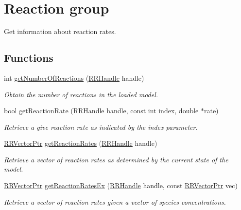 \hypertarget{group__reaction}{\section{Reaction group}
\label{group__reaction}
}


Get information about reaction rates.  


\subsection*{Functions}
\begin{DoxyCompactItemize}
\item 
int \hyperlink{group__reaction_ga45a8bf0e5d7c9012222f0ad4c36e6731}{get\-Number\-Of\-Reactions} (\hyperlink{rrc__types_8h_a1d68f0592372208fa5a5f2799ea4b3ae}{R\-R\-Handle} handle)
\begin{DoxyCompactList}\small\item\em Obtain the number of reactions in the loaded model. \end{DoxyCompactList}\item 
bool \hyperlink{group__reaction_ga9e5d91c68214fd9642d3ffb9338cae19}{get\-Reaction\-Rate} (\hyperlink{rrc__types_8h_a1d68f0592372208fa5a5f2799ea4b3ae}{R\-R\-Handle} handle, const int index, double $\ast$rate)
\begin{DoxyCompactList}\small\item\em Retrieve a give reaction rate as indicated by the index parameter. \end{DoxyCompactList}\item 
\hyperlink{rrc__types_8h_a3be72d6006034fd349f753d2bf441bf7}{R\-R\-Vector\-Ptr} \hyperlink{group__reaction_gaa4b8c528a76898bbb78cfa41479dd085}{get\-Reaction\-Rates} (\hyperlink{rrc__types_8h_a1d68f0592372208fa5a5f2799ea4b3ae}{R\-R\-Handle} handle)
\begin{DoxyCompactList}\small\item\em Retrieve a vector of reaction rates as determined by the current state of the model. \end{DoxyCompactList}\item 
\hyperlink{rrc__types_8h_a3be72d6006034fd349f753d2bf441bf7}{R\-R\-Vector\-Ptr} \hyperlink{group__reaction_ga1dd7908ba77e177592587da9c21ed4f6}{get\-Reaction\-Rates\-Ex} (\hyperlink{rrc__types_8h_a1d68f0592372208fa5a5f2799ea4b3ae}{R\-R\-Handle} handle, const \hyperlink{rrc__types_8h_a3be72d6006034fd349f753d2bf441bf7}{R\-R\-Vector\-Ptr} vec)
\begin{DoxyCompactList}\small\item\em Retrieve a vector of reaction rates given a vector of species concentrations. \end{DoxyCompactList}\item 

\end{DoxyCompactItemize}
